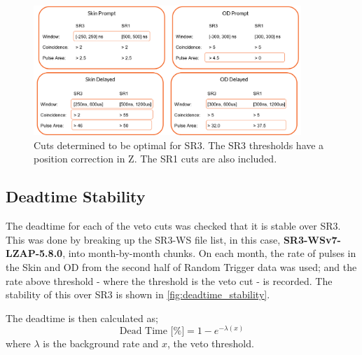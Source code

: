 \begin{figure}
	\centering
	\includegraphics[width=0.9\textwidth]{figures/VetoEfficiency/sr3_cuts.png}
	\caption{Cuts determined to be optimal for SR3.
		The SR3 thresholds have a position correction in Z. The SR1 cuts are also included.}
	\label{fig:sr3_veto_cuts}
\end{figure}

\subsection{Deadtime Stability}

The deadtime for each of the veto cuts was checked that it is stable over SR3.
This was done by breaking up the SR3-WS file list, in this case, \textbf{SR3-WSv7-LZAP-5.8.0}, into month-by-month chunks.
On each month, the rate of pulses in the Skin and OD from the second half of Random Trigger data was used; and the rate above threshold - where the threshold is the veto cut - is recorded. The stability of this over SR3 is shown in \autoref{fig:deadtime_stability}.

The deadtime is then calculated as;
\begin{equation}
	\textrm{Dead Time [\%]} = 1 - e^{-\lambda (x)}
\end{equation}
where $\lambda$ is the background rate and $x$, the veto threshold.


